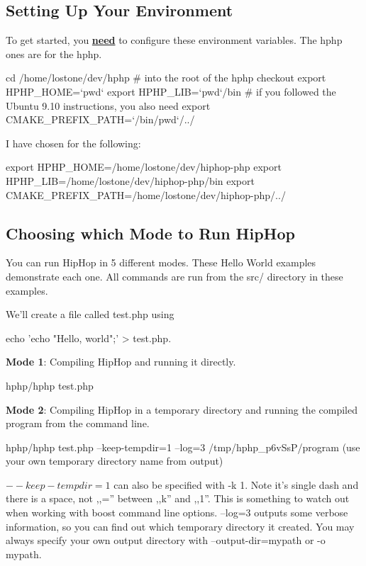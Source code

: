 \subsection{Setting Up Your Environment}
To get started, you \underline{\textbf{need}} to configure these environment variables. The \gls{hphp} ones are for the \gls{hphp}.
\begin{codelisting}
cd /home/lostone/dev/hphp # into the root of the hphp checkout
export HPHP_HOME=`pwd`
export HPHP_LIB=`pwd`/bin
# if you followed the Ubuntu 9.10 instructions, you also need
export CMAKE_PREFIX_PATH=`/bin/pwd`/../
\end{codelisting}
I have chosen for the following:
\begin{codelisting}
export HPHP_HOME=/home/lostone/dev/hiphop-php
export HPHP_LIB=/home/lostone/dev/hiphop-php/bin
export CMAKE_PREFIX_PATH=/home/lostone/dev/hiphop-php/../
\end{codelisting}

\subsection{Choosing which Mode to Run HipHop}
You can run HipHop in 5 different modes. These Hello World examples demonstrate each one. All commands are run from the src/ directory in these examples.

We'll create a file called test.php using 
\begin{codelisting}
echo 'echo "Hello, world";' > test.php.
\end{codelisting}
\textbf{Mode 1}: Compiling HipHop and running it directly.
\begin{codelisting}
hphp/hphp test.php
\end{codelisting}
\textbf{Mode 2}: Compiling HipHop in a temporary directory and running the compiled program from the command line.
\begin{codelisting}
hphp/hphp test.php --keep-tempdir=1 --log=3
/tmp/hphp_p6vSsP/program (use your own temporary directory name from output)
\end{codelisting}
$--keep-tempdir=1$ can also be specified with -k 1. Note it's single dash and there is a space, not ,,=''
between ,,k'' and ,,1''. This is something to watch out when working with boost command line options.
--log=3 outputs some verbose information, so you can find out which temporary directory it created. You
may always specify your own output directory with --output-dir=mypath or -o mypath.


